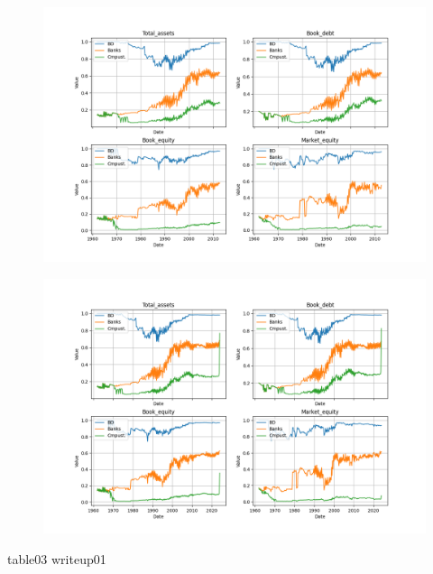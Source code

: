 \documentclass{article}
\begin{document}
\begin{figure}[htbp]\centering\includegraphics[width=\linewidth]{table02_figure.png}\end{figure}\par
\begin{figure}[htbp]\centering\includegraphics[width=\linewidth]{updated_table02_figure.png}\end{figure}\par
\par
table03 writeup01\par
\end{document}
